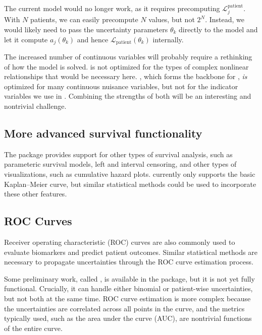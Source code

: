 \documentclass[article]{jss}
\newcommand{\KM}{Kaplan--Meier} %
\begin{document}
The current  model would no longer work, as it requires precomputing \(\mathcal{L}_j^{\text{patient}}\).  With \(N\) patients, we can easily precompute \(N\) values, but not \(2^N\).  Instead, we would likely need to pass the uncertainty parameters \(\theta_k\) directly to the  model and let it compute \(a_j\left(\theta_k\right)\) and hence \(\mathcal{L}_{\text{patient}}\left(\theta_k\right)\) internally.

The increased number of continuous variables will probably require a rethinking of how the model is solved\@.   is not optimized for the types of complex nonlinear relationships that would be necessary here\@.   \citep{minuit}, which forms the backbone for , \emph{is} optimized for many continuous nuisance variables, but not for the indicator variables we use in .  Combining the strengths of both will be an interesting and nontrivial challenge.

\subsection{More advanced survival functionality}

The  package provides support for other types of survival analysis, such as parameteric survival models, left and interval censoring, and other types of visualizations, such as cumulative hazard plots\@.   currently only supports the basic \KM{} curve, but similar statistical methods could be used to incorporate these other features.

\subsection{ROC Curves}

Receiver operating characteristic (ROC) curves are also commonly used to evaluate biomarkers and predict patient outcomes.  Similar statistical methods are necessary to propagate uncertainties through the ROC curve estimation process.

Some preliminary work, called , is available in the  package, but it is not yet fully functional.  Crucially, it can handle either binomial or patient-wise uncertainties, but not both at the same time.  ROC curve estimation is more complex because the uncertainties are correlated across all points in the curve, and the metrics typically used, such as the area under the curve (AUC), are nontrivial functions of the entire curve.
\end{document}
